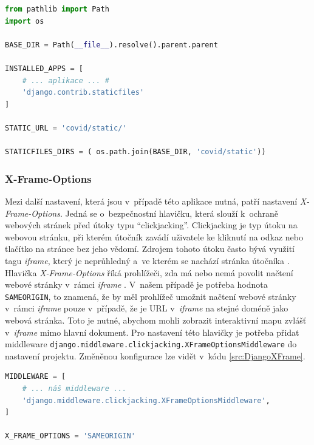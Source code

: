 \begin{lstlisting}[language=Python,label=src:DjangoStaticFiles,caption={Nastavení statických souborů v Djangu \cite{django-static}}]
from pathlib import Path
import os

BASE_DIR = Path(__file__).resolve().parent.parent

INSTALLED_APPS = [
    # ... aplikace ... #
    'django.contrib.staticfiles'
]

STATIC_URL = 'covid/static/'

STATICFILES_DIRS = ( os.path.join(BASE_DIR, 'covid/static'))

\end{lstlisting}

\subsubsection*{X-Frame-Options}

Mezi další nastavení, která jsou v~případě této aplikace nutná, patří nastavení \emph{X-Frame-Options}. Jedná se o~bezpečnostní hlavičku, která slouží k~ochraně webových stránek před útoky typu \enquote{clickjacking}. Clickjacking je typ útoku na webovou stránku, při kterém útočník zavádí uživatele ke kliknutí na odkaz nebo tlačítko na stránce bez jeho vědomí. Zdrojem tohoto útoku často bývá využití tagu \emph{iframe}, který je neprůhledný a~ve kterém se nachází stránka útočníka \cite{google-scholar-clickjacking}. Hlavička \emph{X-Frame-Options} říká prohlížeči, zda má nebo nemá povolit načtení webové stránky v~rámci \emph{iframe} \cite{mozilla-xframe}. V~našem případě je potřeba hodnota \texttt{SAMEORIGIN}, to znamená, že by měl prohlížeč umožnit načtení webové stránky v~rámci \emph{iframe} pouze v~případě, že je URL v~\emph{iframe} na stejné doméně jako webová stránka. Toto je nutné, abychom mohli zobrazit interaktivní mapu zvlášť v~\emph{iframe} mimo hlavní dokument. Pro nastavení této hlavičky je potřeba přidat middleware \lstinline{django.middleware.clickjacking.XFrameOptionsMiddleware} do nastavení projektu. Změněnou konfigurace lze vidět v~kódu \ref{src:DjangoXFrame}.

\begin{lstlisting}[language=Python,label=src:DjangoXFrame,caption={Nastavení X-Frame-Options v Djangu}]
MIDDLEWARE = [
    # ... náš middleware ...
    'django.middleware.clickjacking.XFrameOptionsMiddleware',
]

X_FRAME_OPTIONS = 'SAMEORIGIN'

\end{lstlisting}

